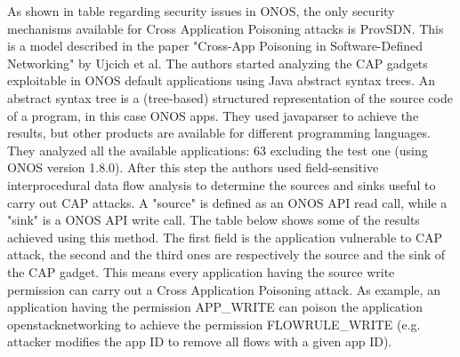As shown in table regarding security issues in ONOS, the only security mechanisms available for Cross Application Poisoning attacks is ProvSDN. This is a model described in the paper "Cross-App Poisoning in Software-Defined Networking" by Ujcich et al. The authors started analyzing the CAP gadgets exploitable in ONOS default applications using Java abstract syntax trees. An abstract syntax tree is a (tree-based) structured representation of the source code of a program, in this case ONOS apps. They used javaparser to achieve the results, but other products are available for different programming languages. They analyzed all the available applications: 63 excluding the test one (using ONOS version 1.8.0). After this step the authors used field-sensitive interprocedural data flow
analysis to determine the sources and sinks useful to carry out CAP attacks. A "source" is defined as an ONOS API read call, while a "sink" is a ONOS API write call. The table below shows some of the results achieved using this method. The first field is the application vulnerable to CAP attack, the second and the third ones are respectively the source and the sink of the CAP gadget. This means every application having the source write permission can carry out a Cross Application Poisoning attack. As example, an application having the permission APP\_WRITE can poison the application openstacknetworking to achieve the permission FLOWRULE\_WRITE (e.g. attacker modifies the app ID to remove all flows with a given app ID). 

